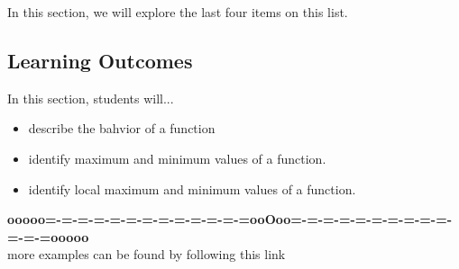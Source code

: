 \documentclass{ximera}
\begin{document}
In this section, we will explore the last four items on this list.







\subsection{Learning Outcomes}

\begin{sectionOutcomes}
In this section, students will...

\begin{itemize}
\item describe the bahvior of a function
\item identify maximum and minimum values of a function.
\item identify local maximum and minimum values of a function.
\end{itemize}
\end{sectionOutcomes}



















\begin{center}
\textbf{\textcolor{green!50!black}{ooooo=-=-=-=-=-=-=-=-=-=-=-=-=ooOoo=-=-=-=-=-=-=-=-=-=-=-=-=ooooo}} \\

more examples can be found by following this link\\ 

\end{center}
\end{document}

